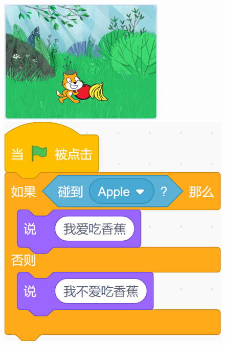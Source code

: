 \documentclass[10pt, a4paper]{article}
\begin{document}
\begin{enumerate}
        \begin{figure}[htbp]
            \centering
            \begin{minipage}[t]{.5\textwidth}
                \centering
                \begin{minipage}[t]{.5\textwidth}
                    \centering
                    \includegraphics[width=\textwidth]{19-1.png}
                \end{minipage}
                \begin{minipage}[t]{.38\textwidth}
                    \centering
                    \includegraphics[width=\textwidth]{19-2.png}

\end{minipage}
\end{minipage}
\end{figure}
\end{enumerate}
\end{document}
